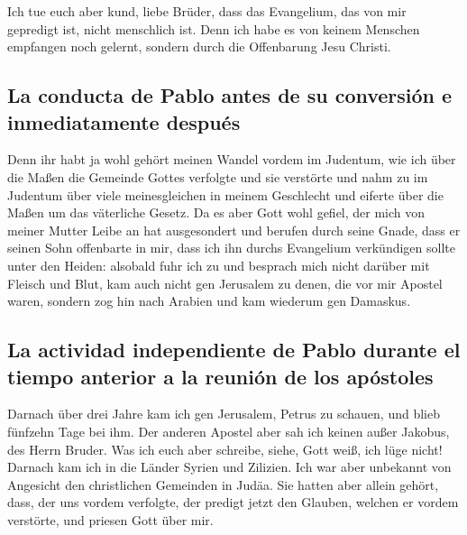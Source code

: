  Ich tue euch aber kund, liebe Brüder, dass das
Evangelium, das von mir gepredigt ist, nicht menschlich ist.
 Denn ich habe es von keinem Menschen empfangen noch
gelernt, sondern durch die Offenbarung Jesu Christi.

\hypertarget{la-conducta-de-pablo-antes-de-su-conversiuxf3n-e-inmediatamente-despuuxe9s}{%
\subsection{La conducta de Pablo antes de su conversión e inmediatamente
después}\label{la-conducta-de-pablo-antes-de-su-conversiuxf3n-e-inmediatamente-despuuxe9s}}

 Denn ihr habt ja wohl gehört meinen Wandel vordem im
Judentum, wie ich über die Maßen die Gemeinde Gottes verfolgte und sie
verstörte  und nahm zu im Judentum über viele
meinesgleichen in meinem Geschlecht und eiferte über die Maßen um das
väterliche Gesetz.  Da es aber Gott wohl gefiel, der mich
von meiner Mutter Leibe an hat ausgesondert und berufen durch seine
Gnade,  dass er seinen Sohn offenbarte in mir, dass ich
ihn durchs Evangelium verkündigen sollte unter den Heiden: alsobald fuhr
ich zu und besprach mich nicht darüber mit Fleisch und Blut,
 kam auch nicht gen Jerusalem zu denen, die vor mir
Apostel waren, sondern zog hin nach Arabien und kam wiederum gen
Damaskus.

\hypertarget{la-actividad-independiente-de-pablo-durante-el-tiempo-anterior-a-la-reuniuxf3n-de-los-apuxf3stoles}{%
\subsection{La actividad independiente de Pablo durante el tiempo
anterior a la reunión de los
apóstoles}\label{la-actividad-independiente-de-pablo-durante-el-tiempo-anterior-a-la-reuniuxf3n-de-los-apuxf3stoles}}

 Darnach über drei Jahre kam ich gen Jerusalem, Petrus zu
schauen, und blieb fünfzehn Tage bei ihm.  Der anderen
Apostel aber sah ich keinen außer Jakobus, des Herrn Bruder.
 Was ich euch aber schreibe, siehe, Gott weiß, ich lüge
nicht!  Darnach kam ich in die Länder Syrien und
Zilizien.  Ich war aber unbekannt von Angesicht den
christlichen Gemeinden in Judäa.  Sie hatten aber allein
gehört, dass, der uns vordem verfolgte, der predigt jetzt den Glauben,
welchen er vordem verstörte,  und priesen Gott über mir.

